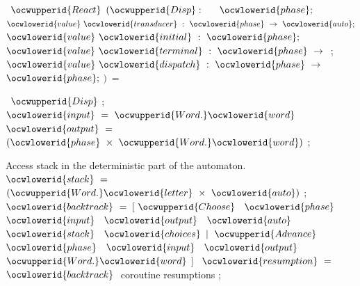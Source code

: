 \documentclass[12pt]{article}
\begin{document}
\label{../ML/reactt.ml:826}%
\ocwindent{0.00em}
~$\ocwupperid{React}$\ocweol
\ocwindent{1.00em}
$(\ocwupperid{Disp}:~$~\ocweol
\ocwindent{4.00em}
~$\ocwlowerid{phase};$\ocweol
\ocwindent{4.00em}
$\ocwlowerid{value}~\ocwlowerid{transducer}~:~\ocwlowerid{phase}~\rightarrow{}~\ocwlowerid{auto};$\ocweol
\ocwindent{4.00em}
$\ocwlowerid{value}~\ocwlowerid{initial}~:~\ocwlowerid{phase};$\ocweol
\ocwindent{4.00em}
$\ocwlowerid{value}~\ocwlowerid{terminal}~:~\ocwlowerid{phase}~\rightarrow{}~$;\ocweol
\ocwindent{4.00em}
$\ocwlowerid{value}~\ocwlowerid{dispatch}~:~\ocwlowerid{phase}~\rightarrow{}~$~$\ocwlowerid{phase};$\ocweol
\ocwindent{4.00em}
$)~=~$\medskip

\label{../ML/reactt.ml:1055}%
\ocwindent{0.00em}
~$\ocwupperid{Disp}$\ocweol
\ocwindent{0.00em}
;\ocweol
\ocwindent{0.00em}
~$\ocwlowerid{input}~=~\ocwupperid{Word.}\ocwlowerid{word}~$\ocweol
\ocwindent{0.00em}
~$\ocwlowerid{output}~=~$~$(\ocwlowerid{phase}~\times{}~\ocwupperid{Word.}\ocwlowerid{word})$\ocweol
\ocwindent{0.00em}
;\medskip

\ocwendcode{}\ocwindent{0.00em}
Access stack in the deterministic part of the automaton. 
\ocweol
\label{../ML/reactt.ml:1195}%
\medskip
\ocwbegincode{}\ocwindent{0.00em}
~$\ocwlowerid{stack}~=~$~$(\ocwupperid{Word.}\ocwlowerid{letter}~\times{}~\ocwlowerid{auto})$\ocweol
\ocwindent{0.00em}
;\ocweol
\ocwindent{0.00em}
~$\ocwlowerid{backtrack}~=$\ocweol
\ocwindent{1.00em}
$[~\ocwupperid{Choose}~$~$\ocwlowerid{phase}~$~$\ocwlowerid{input}~$~$\ocwlowerid{output}~$~$\ocwlowerid{auto}~$~$\ocwlowerid{stack}~$~$\ocwlowerid{choices}$\ocweol
\ocwindent{1.00em}
$\mid{}~\ocwupperid{Advance}~$~$\ocwlowerid{phase}~$~$\ocwlowerid{input}~$~$\ocwlowerid{output}~$~$\ocwupperid{Word.}\ocwlowerid{word}$\ocweol
\ocwindent{1.00em}
$]$\ocweol
\ocwindent{0.00em}
~$\ocwlowerid{resumption}~=~$~$\ocwlowerid{backtrack}~$\ocwbc{} coroutine resumptions \ocwec{}\ocweol
\ocwindent{0.00em}
;\medskip
\end{document}
